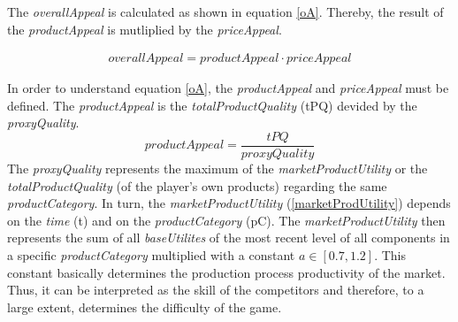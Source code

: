 The \textit{overallAppeal} is calculated as shown in equation \ref{oA}. Thereby, the result of the \textit{productAppeal} is mutliplied by the \textit{priceAppeal}. 


\begin{equation}
\label{oA}
\begin{aligned}
overallAppeal = productAppeal \cdot priceAppeal
\end{aligned}
\end{equation}

In order to understand equation \ref{oA}, the \textit{productAppeal} and \textit{priceAppeal} must be defined.
% 
The \textit{productAppeal} is the \textit{totalProductQuality} (tPQ) devided by the \textit{proxyQuality}.
\begin{equation}
    productAppeal = \dfrac{tPQ}{proxyQuality}
\end{equation}
The \textit{proxyQuality} represents the maximum of the \textit{marketProductUtility} or the \textit{totalProductQuality} (of the player's own products) regarding the same \textit{productCategory}.
In turn, the \textit{marketProductUtility} (\ref{marketProdUtility}) depends on the \textit{time} (t) and on the \textit{productCategory} (\gls{pC}). The \textit{marketProductUtility} then represents the sum of all \textit{baseUtilites} of the most recent level of all components in a specific \textit{productCategory} multiplied with a constant $a \in [0.7, 1.2]$. 
This constant basically determines the production process productivity of the market. Thus, it can be interpreted as the skill of the competitors and therefore, to a large extent, determines the difficulty of the game.

